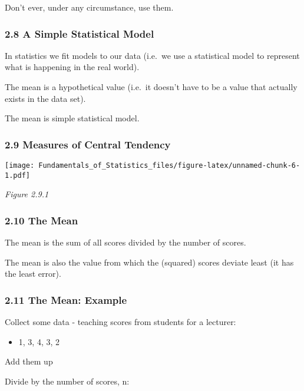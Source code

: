 \documentclass[]{article}
\providecommand{\tightlist}{%
  \setlength{\itemsep}{0pt}\setlength{\parskip}{0pt}}
\begin{document}
Don't ever, under any circumstance, use them.

\hypertarget{a-simple-statistical-model}{%
\subsubsection{2.8 A Simple Statistical
Model}\label{a-simple-statistical-model}}

In statistics we fit models to our data (i.e.~we use a statistical model
to represent what is happening in the real world).

The mean is a hypothetical value (i.e.~it doesn't have to be a value
that actually exists in the data set).

The mean is simple statistical model.

\hypertarget{measures-of-central-tendency}{%
\subsubsection{2.9 Measures of Central
Tendency}\label{measures-of-central-tendency}}

\texttt{[image: Fundamentals\_of\_Statistics\_files/figure-latex/unnamed-chunk-6-1.pdf]}

\emph{Figure 2.9.1}

\hypertarget{the-mean}{%
\subsubsection{2.10 The Mean}\label{the-mean}}

The mean is the sum of all scores divided by the number of scores.

The mean is also the value from which the (squared) scores deviate least
(it has the least error).

\hypertarget{the-mean-example}{%
\subsubsection{2.11 The Mean: Example}\label{the-mean-example}}

Collect some data - teaching scores from students for a lecturer:

\begin{itemize}
\tightlist
\item
  1, 3, 4, 3, 2
\end{itemize}

Add them up

Divide by the number of scores, n:
\end{document}
